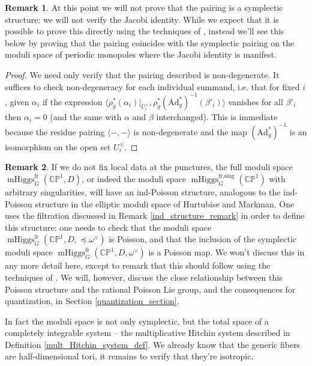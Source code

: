 \documentclass[11pt, oneside, reqno]{amsart}
\theoremstyle{definition} \newtheorem{definition}{Definition}[section]
\theoremstyle{definition} \newtheorem{remark}[definition]{Remark}
\theoremstyle{definition} \newtheorem{remarks}[definition]{Remarks}
\theoremstyle{definition} \newtheorem{question}[definition]{Question}
\theoremstyle{definition} \newtheorem*{note}{Note}
\theoremstyle{definition} \newtheorem{example}[definition]{Example}
\theoremstyle{definition} \newtheorem{examples}[definition]{Examples}
\newcommand{\bb}[1]{\mathbb{#1}}
\newcommand{\mr}[1]{\mathrm{#1}}
\DeclareMathOperator{\mhiggs}{mHiggs}
\newcommand{\fr}{\mathrm{fr}}
\newcommand{\Ad}{\mr{Ad}}
\begin{document}
\begin{remark}
At this point we will not prove that the pairing is a symplectic structure: we will not verify the Jacobi identity.  While we expect that it is possible to prove this directly using the techniques of \cite[Section 5]{HurtubiseMarkman}, instead we'll see this below by proving that the pairing coincides with the symplectic pairing on the moduli space of periodic monopoles where the Jacobi identity is manifest.
\end{remark}

\begin{proof}
We need only verify that the pairing described is non-degenerate.  It suffices to check non-degeneracy for each individual summand, i.e. that for fixed $i$, given $\alpha_i$ if the expression $\langle \rho_g^*(\alpha_i)|_{U^\times_i}, \rho_g^*(\Ad_g^*)^{-1}(\beta'_i) \rangle$ vanishes for all $\beta'_i$ then $\alpha_i=0$ (and the same with $\alpha$ and $\beta$ interchanged).  This is immediate because the residue pairing $\langle - , - \rangle$ is non-degenerate and the map $(\Ad_g^*)^{-1}$ is an isomorphism on the open set $U^\times_i$.
\end{proof}

\begin{remark}
If we do not fix local data at the punctures, the full moduli space $\mhiggs_G^\fr(\bb{CP}^1,D)$, or indeed the moduli space $\mhiggs_G^{\text{fr,sing}}(\bb{CP}^1)$ with arbitrary singularities, will have an ind-Poisson structure, analogous to the ind-Poisson structure in the elliptic moduli space of Hurtubise and Markman.  One uses the filtration discussed in Remark \ref{ind_structure_remark} in order to define this structure: one needs to check that the moduli space  $\mhiggs_G^\fr(\bb{CP}^1,D, \preceq \omega^\vee)$ is Poisson, and that the inclusion of the symplectic moduli space $\mhiggs_G^\fr(\bb{CP}^1,D, \omega^\vee)$ is a Poisson map.  We won't discuss this in any more detail here, except to remark that this should follow using the techniques of \cite[Section 7]{HurtubiseMarkman}.  We will, however, discuss the close relationship between this Poisson structure and the rational Poisson Lie group, and the consequences for quantization, in Section \ref{quantization_section}.
\end{remark}

In fact the moduli space is not only symplectic, but the total space of a completely integrable system -- the multiplicative Hitchin system described in Definition \ref{mult_Hitchin_system_def}.  We already know that the generic fibers are half-dimensional tori, it remains to verify that they're isotropic.
\end{document}

